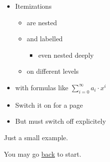 \documentclass[30pt,landscape]{foils}
\begin{document}

\begin{itemize}
\item Itemizations\pause
  \begin{itemize}
  \item are nested\pause
  \item and labelled
    \hypertarget{start}{} %
    \begin{itemize}
    \item even nested deeply\pause
    \end{itemize}
  \item on different levels\pause
  \end{itemize}
\item with formulas like $\sum_{i=0}^\infty a_i\cdot x^i$

\end{itemize}

\hypersetup{pdfpagetransition=Dissolve}
\begin{itemize}
\item Switch it on for a page\pause
\item But must switch off explicitely
\end{itemize}

\hypersetup{pdfpagetransition=R}
\begin{center}
Just a small example.

You may go \hyperlink{start}{back} to start.
\end{center}
\end{document}
